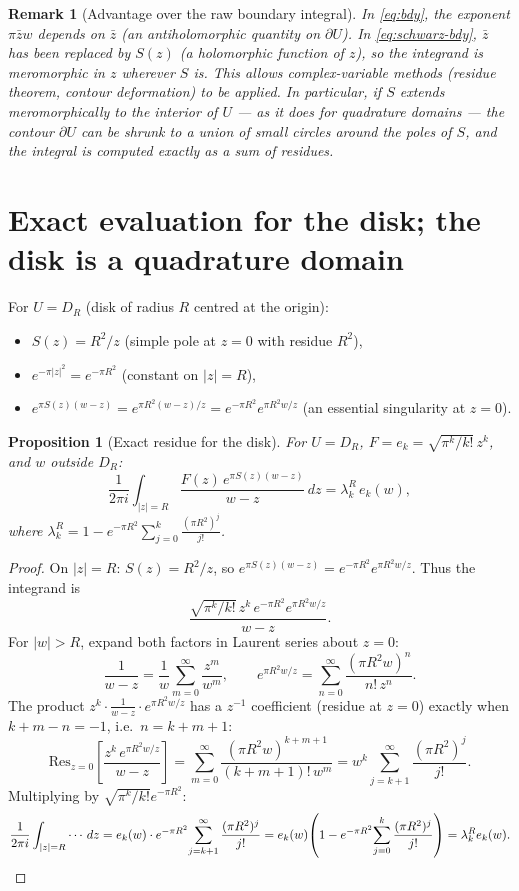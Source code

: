\documentclass[a4paper,11pt,reqno]{amsart}
\newtheorem{proposition}{Proposition}[section]
\newtheorem{remark}{Remark}[section]
\begin{document}
\begin{remark}[Advantage over the raw boundary integral]
In \eqref{eq:bdy}, the exponent $\pi\bar{z}w$ depends on $\bar z$ (an
antiholomorphic quantity on $\partial U$). In \eqref{eq:schwarz-bdy}, $\bar z$
has been replaced by $S(z)$ (a holomorphic function of $z$), so the integrand
is meromorphic in $z$ wherever $S$ is. This allows complex-variable methods
(residue theorem, contour deformation) to be applied. In particular, if $S$
extends meromorphically to the interior of $U$ --- as it does for quadrature
domains --- the contour $\partial U$ can be shrunk to a union of small circles
around the poles of $S$, and the integral is computed exactly as a sum of
residues.
\end{remark}

\section{Exact evaluation for the disk; the disk is a quadrature domain}
\label{sec:exact}

For $U=D_R$ (disk of radius $R$ centred at the origin):
\begin{itemize}
\item $S(z)=R^2/z$ (simple pole at $z=0$ with residue $R^2$),
\item $e^{-\pi|z|^2}=e^{-\pi R^2}$ (constant on $|z|=R$),
\item $e^{\pi S(z)(w-z)}=e^{\pi R^2(w-z)/z}=e^{-\pi R^2}e^{\pi R^2 w/z}$
  (an essential singularity at $z=0$).
\end{itemize}

\begin{proposition}[Exact residue for the disk]
\label{prop:disk-residue}
For $U=D_R$, $F=e_k=\sqrt{\pi^k/k!}\,z^k$, and $w$ outside $D_R$:
\[
\frac{1}{2\pi i}\int_{|z|=R}\frac{F(z)\,e^{\pi S(z)(w-z)}}{w-z}\,dz
=\lambda_k^R\,e_k(w),
\]
where $\lambda_k^R=1-e^{-\pi R^2}\sum_{j=0}^k\frac{(\pi R^2)^j}{j!}$.
\end{proposition}

\begin{proof}
On $|z|=R$: $S(z)=R^2/z$, so $e^{\pi S(z)(w-z)}=e^{-\pi R^2}e^{\pi R^2 w/z}$.
Thus the integrand is
\[
\frac{\sqrt{\pi^k/k!}\,z^k\,e^{-\pi R^2}e^{\pi R^2 w/z}}{w-z}.
\]
For $|w|>R$, expand both factors in Laurent series about $z=0$:
\[
\frac{1}{w-z}=\frac{1}{w}\sum_{m=0}^\infty\frac{z^m}{w^m},\qquad
e^{\pi R^2 w/z}=\sum_{n=0}^\infty\frac{(\pi R^2 w)^n}{n!\,z^n}.
\]
The product $z^k\cdot\frac{1}{w-z}\cdot e^{\pi R^2w/z}$ has a $z^{-1}$
coefficient (residue at $z=0$) exactly when $k+m-n=-1$, i.e.\ $n=k+m+1$:
\[
\mathrm{Res}_{z=0}\!\left[\frac{z^k\,e^{\pi R^2 w/z}}{w-z}\right]
=\sum_{m=0}^\infty\frac{(\pi R^2 w)^{k+m+1}}{(k+m+1)!\,w^m}
=w^k\sum_{j=k+1}^\infty\frac{(\pi R^2)^j}{j!}.
\]
Multiplying by $\sqrt{\pi^k/k!}e^{-\pi R^2}$:
\[
\frac{1}{2\pi i}\int_{|z|=R}\cdots\,dz
=e_k(w)\cdot e^{-\pi R^2}\!\sum_{j=k+1}^\infty\frac{(\pi R^2)^j}{j!}
=e_k(w)\!\left(1-e^{-\pi R^2}\!\sum_{j=0}^k\frac{(\pi R^2)^j}{j!}\right)
=\lambda_k^R e_k(w).\qedhere
\]
\end{proof}
\end{document}
